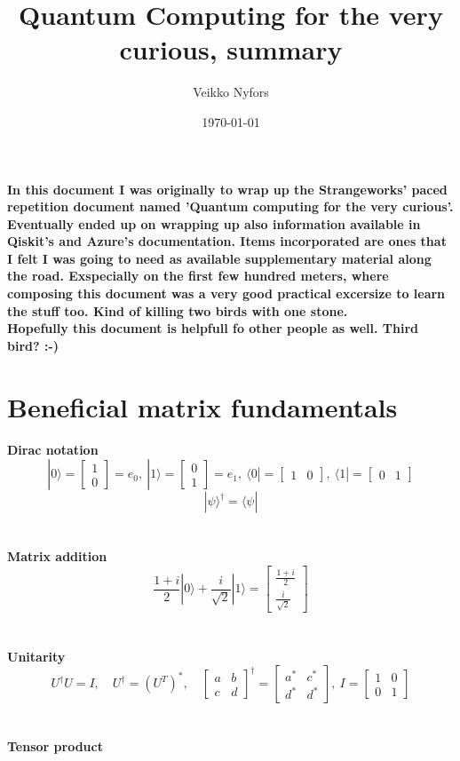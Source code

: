 \documentclass[11pt, fleqn]{article}
\title{Quantum Computing for the very curious, summary}
\author{Veikko Nyfors}
\date{\today}
\begin{document}
\maketitle

\paragraph{In this document I was originally to wrap up the Strangeworks' paced repetition document named 'Quantum computing for the very curious'.
Eventually ended up on wrapping up also information available in Qiskit's and Azure's documentation.
Items incorporated are ones that I felt I was going to need as available supplementary material along the road.
Exspecially on the first few hundred meters, where composing this document was a very good practical excersize to learn the stuff too.
Kind of killing two birds with one stone.
\\
Hopefully this document is helpfull fo other people as well. Third bird? :-)
}


\newpage

\section{Beneficial matrix fundamentals}

\bf{Dirac notation}
\[|0\rangle=\begin{bmatrix} 1\\0\end{bmatrix}=e_0,\:
|1\rangle=\begin{bmatrix} 0\\1\end{bmatrix}=e_1,\:
\langle0|=\begin{bmatrix} 1&0\end{bmatrix},\:\langle1|=\begin{bmatrix} 0&1\end{bmatrix}\]
\[|\psi\rangle^\dagger=\langle\psi|\]
\\~\\
\bf{Matrix addition}
\[\frac{1+i}{2}|0\rangle + \frac{i}{\sqrt{2}}|1\rangle = \begin{bmatrix} \frac{1+i}{2}\\\frac{i}{\sqrt{2}} \end{bmatrix}\]
\\~\\
\bf{Unitarity}
\[U^\dagger U=I,\quad U^\dagger=(U^T)^*,\quad
\begin{bmatrix}a & b\\c & d\end{bmatrix}^\dagger=\begin{bmatrix}a^* & c^*\\d^* & d^*\end{bmatrix},\:I=\begin{bmatrix}1&0\\0&1\end{bmatrix}\]
\\~\\
\bf{Tensor product\\}
\end{document}
